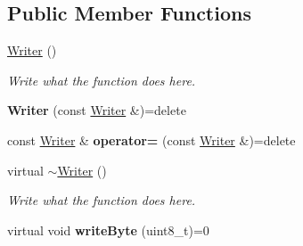 \subsection*{Public Member Functions}
\begin{DoxyCompactItemize}
\item 
\hyperlink{classWriter_aedc04cd5fb7b4b99d3ad906fef2116ce}{Writer} ()
\begin{DoxyCompactList}\small\item\em Write what the function does here. \end{DoxyCompactList}\item 
\hypertarget{classWriter_af731baeb537162d04d4925d0b505c39f}{{\bfseries Writer} (const \hyperlink{classWriter}{Writer} \&)=delete}\label{classWriter_af731baeb537162d04d4925d0b505c39f}

\item 
\hypertarget{classWriter_ab08fa23e717cff9212fe14489745a01b}{const \hyperlink{classWriter}{Writer} \& {\bfseries operator=} (const \hyperlink{classWriter}{Writer} \&)=delete}\label{classWriter_ab08fa23e717cff9212fe14489745a01b}

\item 
virtual \hyperlink{classWriter_ac1805972274066158c1a739a34b3428a}{$\sim$\+Writer} ()
\begin{DoxyCompactList}\small\item\em Write what the function does here. \end{DoxyCompactList}\item 
\hypertarget{classWriter_af9510dca900acf5724abb8225a55aaae}{virtual void {\bfseries write\+Byte} (uint8\+\_\+t)=0}\label{classWriter_af9510dca900acf5724abb8225a55aaae}


\end{DoxyCompactItemize}
